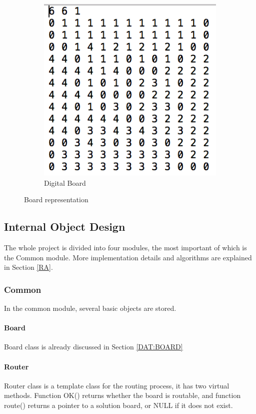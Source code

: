 \documentclass{article}
\begin{document}
\begin{spacing}{1.1}
\begin{figure}[H]
\begin{subfigure}{0.4\textwidth}
            \includegraphics[width = \textwidth]{dat2.png}
            \caption{Digital Board}
        \end{subfigure}
        \caption{Board representation}
    \end{figure}
    \subsection{Internal Object Design}
    The whole project is divided into four modules, the most important of which is the Common module. More implementation details and algorithms are explained in Section \ref{RA}.
    \subsubsection{Common}
    In the common module, several basic objects are stored.
    \paragraph{Board}
    Board class is already discussed in Section \ref{DAT:BOARD}
    \paragraph{Router}
    Router class is a template class for the routing process, it has two virtual methods. Function OK() returns whether the board is routable, and function route() returns a pointer to a solution board, or NULL if it does not exist.

\end{spacing}
\end{document}
